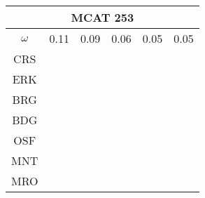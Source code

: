 \documentclass[a4paper,12pt]{article}
\begin{document}
\begin{tabular}{|c|c|c|c|c|c|}%
         \hline \multicolumn{6}{|c|}{MCAT 253} \\ \hline
         $\omega$&0.11&0.09&0.06&0.05&0.05\\ \hline %
        CRS&\cellcolor[HTML]{E41A1C}&\cellcolor[HTML]{E41A1C}&\cellcolor[HTML]{E41A1C}&\cellcolor[HTML]{E41A1C}&\cellcolor[HTML]{E41A1C}\\ \hline %
        ERK&\cellcolor[HTML]{E41A1C}&\cellcolor[HTML]{E41A1C}&\cellcolor[HTML]{E41A1C}&\cellcolor[HTML]{377EB8}&\cellcolor[HTML]{E41A1C}\\ \hline %
        BRG&\cellcolor[HTML]{E41A1C}&\cellcolor[HTML]{377EB8}&\cellcolor[HTML]{E41A1C}&\cellcolor[HTML]{377EB8}&\cellcolor[HTML]{377EB8}\\ \hline %
        BDG&\cellcolor[HTML]{377EB8}&\cellcolor[HTML]{377EB8}&\cellcolor[HTML]{377EB8}&\cellcolor[HTML]{4DAF4A}&\cellcolor[HTML]{4DAF4A}\\ \hline %
        OSF&\cellcolor[HTML]{377EB8}&\cellcolor[HTML]{377EB8}&\cellcolor[HTML]{377EB8}&\cellcolor[HTML]{4DAF4A}&\cellcolor[HTML]{4DAF4A}\\ \hline %
        MNT&\cellcolor[HTML]{4DAF4A}&\cellcolor[HTML]{4DAF4A}&\cellcolor[HTML]{4DAF4A}&\cellcolor[HTML]{984EA3}&\cellcolor[HTML]{984EA3}\\ \hline %
        MRO&\cellcolor[HTML]{4DAF4A}&\cellcolor[HTML]{4DAF4A}&\cellcolor[HTML]{4DAF4A}&\cellcolor[HTML]{984EA3}&\cellcolor[HTML]{984EA3}\\ \hline %

\end{tabular}
\end{document}
